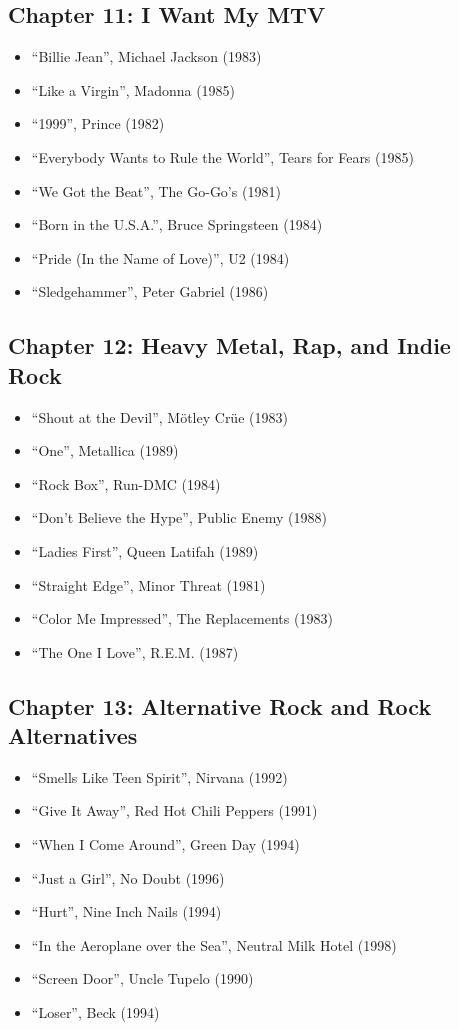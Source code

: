 \documentclass[12pt, a4paper]{book}
\begin{document}
\subsection*{Chapter 11: I Want My MTV}
\begin{itemize}
    \item ``Billie Jean'', Michael Jackson (1983)
    \item ``Like a Virgin'', Madonna (1985)
    \item ``1999'', Prince (1982)
    \item ``Everybody Wants to Rule the World'', Tears for Fears (1985)
    \item ``We Got the Beat'', The Go-Go's (1981)
    \item ``Born in the U.S.A.'', Bruce Springsteen (1984)
    \item ``Pride (In the Name of Love)'', U2 (1984)
    \item ``Sledgehammer'', Peter Gabriel (1986)
\end{itemize}

\subsection*{Chapter 12: Heavy Metal, Rap, and Indie Rock}
\begin{itemize}
    \item ``Shout at the Devil'', Mötley Crüe (1983)
    \item ``One'', Metallica (1989)
    \item ``Rock Box'', Run-DMC (1984)
    \item ``Don't Believe the Hype'', Public Enemy (1988)
    \item ``Ladies First'', Queen Latifah (1989)
    \item ``Straight Edge'', Minor Threat (1981)
    \item ``Color Me Impressed'', The Replacements (1983)
    \item ``The One I Love'', R.E.M. (1987)
\end{itemize}

\subsection*{Chapter 13: Alternative Rock and Rock Alternatives}
\begin{itemize}
    \item ``Smells Like Teen Spirit'', Nirvana (1992)
    \item ``Give It Away'', Red Hot Chili Peppers (1991)
    \item ``When I Come Around'', Green Day (1994)
    \item ``Just a Girl'', No Doubt (1996)
    \item ``Hurt'', Nine Inch Nails (1994)
    \item ``In the Aeroplane over the Sea'', Neutral Milk Hotel (1998)
    \item ``Screen Door'', Uncle Tupelo (1990)
    \item ``Loser'', Beck (1994)
\end{itemize}
\end{document}
